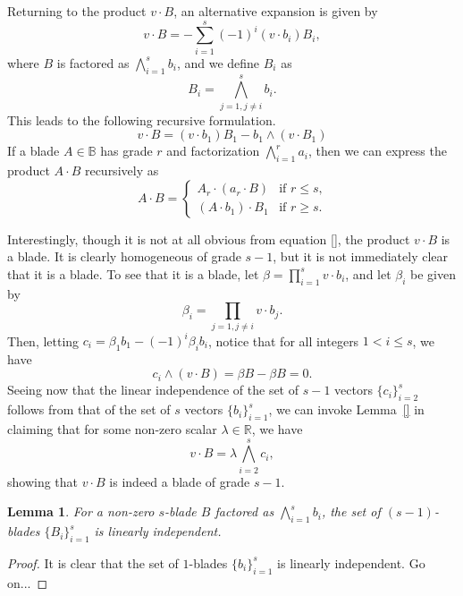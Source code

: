 \documentclass{birkjour}
\newtheorem{lem}[thm]{Lemma}
\theoremstyle{definition}
\theoremstyle{remark}
\numberwithin{equation}{section}
\newcommand{\R}{\mathbb{R}}
\newcommand{\B}{\mathbb{B}}
\begin{document}
Returning to the product $v\cdot B$, an alternative expansion is given by
\begin{equation*}
v\cdot B = -\sum_{i=1}^s (-1)^i(v\cdot b_i)B_i,
\end{equation*}
where $B$ is factored as $\bigwedge_{i=1}^s b_i$, and we define $B_i$ as
\begin{equation*}
B_i = \bigwedge_{j=1,j\neq i}^s b_i.
\end{equation*}
This leads to the following recursive formulation.
\begin{equation*}
v\cdot B=(v\cdot b_1)B_1-b_1\wedge(v\cdot B_1)
\end{equation*}
If a blade $A\in\B$ has grade $r$ and factorization $\bigwedge_{i=1}^r a_i$, then
we can express the product $A\cdot B$ recursively as
\begin{equation*}
A\cdot B = \left\{\begin{array}{ll}
A_r\cdot (a_r\cdot B) & \mbox{if $r\leq s$,} \\
(A\cdot b_1)\cdot B_1 & \mbox{if $r\geq s$.}
\end{array}\right.
\end{equation*}

Interestingly, though it is not at all obvious from equation \eqref{}, the product
$v\cdot B$ is a blade.  It is clearly homogeneous of grade $s-1$, but it is not
immediately clear that it is a blade.  To see that it is a blade, let $\beta=\prod_{i=1}^s v\cdot b_i$,
and let $\beta_i$ be given by
\begin{equation*}
\beta_i=\prod_{j=1,j\neq i}v\cdot b_j.
\end{equation*}
Then, letting $c_i=\beta_1b_1-(-1)^i\beta_ib_i$, notice that for all integers $1<i\leq s$,
we have
\begin{equation*}
c_i\wedge (v\cdot B)=\beta B-\beta B=0.
\end{equation*}
Seeing now that the linear independence of the set of $s-1$ vectors
$\{c_i\}_{i=2}^s$ follows from that of the set of $s$ vectors $\{b_i\}_{i=1}^s$,
we can invoke Lemma~\ref{} in claiming that for some non-zero scalar $\lambda\in\R$,
we have
\begin{equation*}
v\cdot B = \lambda\bigwedge_{i=2}^s c_i,
\end{equation*}
showing that $v\cdot B$ is indeed a blade of grade $s-1$.

\begin{lem}
For a non-zero $s$-blade $B$ factored as $\bigwedge_{i=1}^s b_i$, the set of
$(s-1)$-blades $\{B_i\}_{i=1}^s$ is linearly independent.
\end{lem}
\begin{proof}
It is clear that the set of $1$-blades $\{b_i\}_{i=1}^s$ is linearly independent.  Go on...
\end{proof}
\end{document}
